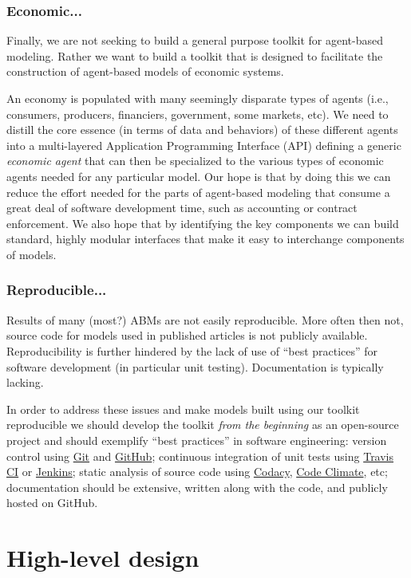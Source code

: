 \documentclass[11pt]{amsart}
\begin{document}
\subsubsection{Economic...}
Finally, we are not seeking to build a general purpose toolkit for agent-based modeling. Rather we want to build a toolkit that is designed to facilitate the construction of agent-based models of economic systems.

An economy is populated with many seemingly disparate types of agents (i.e., consumers, producers, financiers, government, some markets, etc). We need to distill the core essence (in terms of data and behaviors) of these different agents into a multi-layered Application Programming Interface (API) defining a generic \textit{economic agent} that can then be specialized to the various types of economic agents needed for any particular model. Our hope is that by doing this we can reduce the effort needed for the parts of agent-based modeling that consume a great deal of software development time, such as accounting or contract enforcement.  We also hope that by identifying the key components we can build standard, highly modular interfaces that make it easy to interchange components of models.

\subsubsection{Reproducible...}
Results of many (most?) ABMs are not easily reproducible. More often then not, source code for models used in published articles is not publicly available. Reproducibility is further hindered by the lack of use of ``best practices'' for software development (in particular unit testing). Documentation is typically lacking. 

In order to address these issues and make models built using our toolkit reproducible we should develop the toolkit \textit{from the beginning} as an open-source project and should exemplify ``best practices'' in software engineering: version control using \href{https://git-scm.com/}{Git} and \href{https://github.com/}{GitHub}; continuous integration of unit tests using \href{https://travis-ci.org/}{Travis CI} or \href{https://jenkins-ci.org/}{Jenkins}; static analysis of source code using \href{https://www.codacy.com/login}{Codacy}, \href{https://codeclimate.com/}{Code Climate}, etc; documentation should be extensive, written along with the code, and publicly hosted on GitHub.   
    
\section{High-level design}
\end{document}
